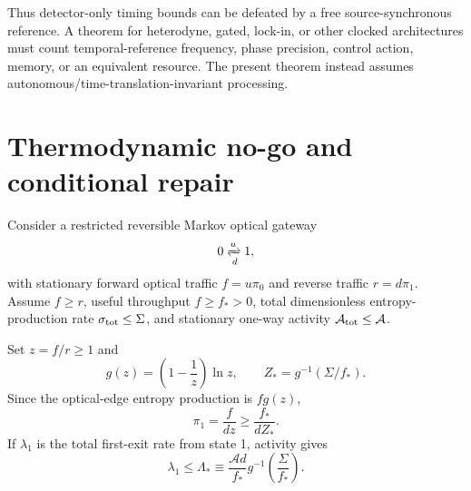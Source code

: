 \documentclass[aps,prapplied,preprint,nofootinbib]{revtex4-2}
\begin{document}
Thus detector-only timing bounds can be defeated by a free source-synchronous reference. A theorem for heterodyne, gated, lock-in, or other clocked architectures must count temporal-reference frequency, phase precision, control action, memory, or an equivalent resource. The present theorem instead assumes autonomous/time-translation-invariant processing.

\section{Thermodynamic no-go and conditional repair}
\label{sec:thermo}

Consider a restricted reversible Markov optical gateway
\begin{equation}
0\xrightleftharpoons[d]{u}1,
\end{equation}
with stationary forward optical traffic $f=u\pi_0$ and reverse traffic $r=d\pi_1$. Assume $f\ge r$, useful throughput $f\ge f_*>0$, total dimensionless entropy-production rate $\sigma_{\rm tot}\le\Sigma$, and stationary one-way activity $\mathcal A_{\rm tot}\le\mathcal A$.

Set $z=f/r\ge1$ and
\begin{equation}
g(z)=\left(1-\frac1z\right)\ln z,
\qquad
Z_*=g^{-1}(\Sigma/f_*).
\end{equation}
Since the optical-edge entropy production is $f g(z)$,
\begin{equation}
\pi_1=\frac{f}{dz}\ge\frac{f_*}{dZ_*}.
\end{equation}
If $\lambda_1$ is the total first-exit rate from state 1, activity gives
\begin{equation}
\boxed{
\lambda_1\le\Lambda_*
\equiv\frac{\mathcal A d}{f_*}
 g^{-1}\!\left(\frac{\Sigma}{f_*}\right).}
\label{eq:Lstar}
\end{equation}
\end{document}
